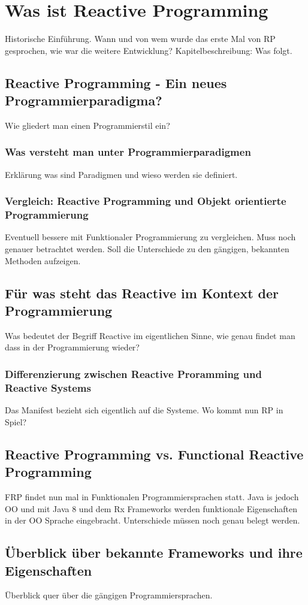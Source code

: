 \chapter{Was ist Reactive Programming}\label{was_ist_reactive_programming}
Historische Einführung. Wann und von wem wurde das erste Mal von RP gesprochen, wie war die weitere Entwicklung?
Kapitelbeschreibung: Was folgt. 
\section{Reactive Programming - Ein neues Programmierparadigma?}
Wie gliedert man einen Programmierstil ein? 
\subsection{Was versteht man unter Programmierparadigmen}
 Erklärung was sind Paradigmen und wieso werden sie definiert.
\subsection{Vergleich: Reactive Programming und Objekt orientierte Programmierung}
Eventuell bessere mit Funktionaler Programmierung zu vergleichen. Muss noch genauer betrachtet werden. Soll die Unterschiede zu den gängigen, bekannten Methoden aufzeigen.
\section{Für was steht das Reactive im Kontext der Programmierung}
Was bedeutet der Begriff Reactive im eigentlichen Sinne, wie genau findet man dass in der Programmierung wieder?
\subsection{Differenzierung zwischen Reactive Proramming und Reactive Systems}
Das Manifest bezieht sich eigentlich auf die Systeme. Wo kommt nun RP in Spiel? 
\section{Reactive Programming vs. Functional Reactive Programming}
FRP findet nun mal in Funktionalen Programmiersprachen statt. Java is jedoch OO und mit Java 8 und dem Rx Frameworks werden funktionale Eigenschaften in der OO Sprache eingebracht. Unterschiede müssen noch genau belegt werden.
\section{Überblick über bekannte Frameworks und ihre Eigenschaften}
Überblick quer über die gängigen Programmiersprachen. 
